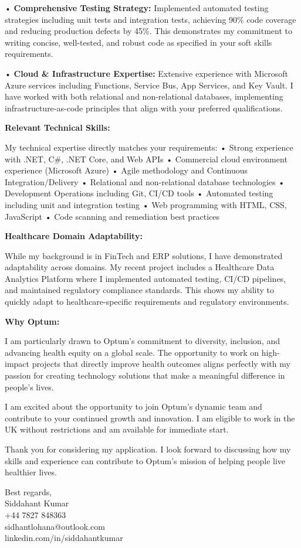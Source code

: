 \documentclass[letterpaper,10pt]{article}
\begin{document}
• \textbf{Comprehensive Testing Strategy:} Implemented automated testing strategies including unit tests and integration tests, achieving 90\% code coverage and reducing production defects by 45\%. This demonstrates my commitment to writing concise, well-tested, and robust code as specified in your soft skills requirements.

• \textbf{Cloud \& Infrastructure Expertise:} Extensive experience with Microsoft Azure services including Functions, Service Bus, App Services, and Key Vault. I have worked with both relational and non-relational databases, implementing infrastructure-as-code principles that align with your preferred qualifications.

\textbf{Relevant Technical Skills:}

My technical expertise directly matches your requirements:
• Strong experience with .NET, C\#, .NET Core, and Web APIs
• Commercial cloud environment experience (Microsoft Azure)
• Agile methodology and Continuous Integration/Delivery
• Relational and non-relational database technologies
• Development Operations including Git, CI/CD tools
• Automated testing including unit and integration testing
• Web programming with HTML, CSS, JavaScript
• Code scanning and remediation best practices

\textbf{Healthcare Domain Adaptability:}

While my background is in FinTech and ERP solutions, I have demonstrated adaptability across domains. My recent project includes a Healthcare Data Analytics Platform where I implemented automated testing, CI/CD pipelines, and maintained regulatory compliance standards. This shows my ability to quickly adapt to healthcare-specific requirements and regulatory environments.

\textbf{Why Optum:}

I am particularly drawn to Optum's commitment to diversity, inclusion, and advancing health equity on a global scale. The opportunity to work on high-impact projects that directly improve health outcomes aligns perfectly with my passion for creating technology solutions that make a meaningful difference in people's lives.

I am excited about the opportunity to join Optum's dynamic team and contribute to your continued growth and innovation. I am eligible to work in the UK without restrictions and am available for immediate start.

Thank you for considering my application. I look forward to discussing how my skills and experience can contribute to Optum's mission of helping people live healthier lives.

Best regards,\\
Siddahant Kumar\\
+44 7827 848363\\
sidhantlohana@outlook.com\\
linkedin.com/in/siddahantkumar

\vspace*{\fill}
\end{document}
